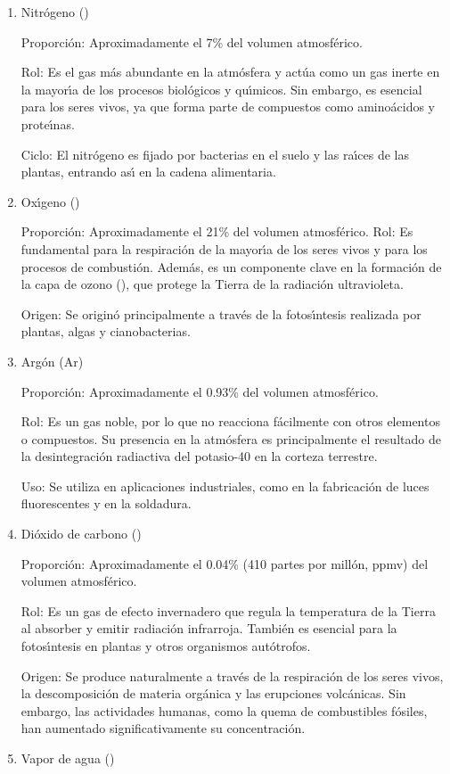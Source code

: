 \begin{enumerate}
\item  Nitr\'ogeno ()

Proporci\'on: Aproximadamente el 7\% del volumen atmosf\'erico.

Rol: Es el gas m\'as abundante en la atm\'osfera y act\'ua como un gas inerte en la mayor\'{\i}a de los procesos biol\'ogicos y qu\'{\i}micos. Sin embargo, es esencial para los seres vivos, ya que forma parte de compuestos como amino\'acidos y prote\'{\i}nas.

Ciclo: El nitr\'ogeno es fijado por bacterias en el suelo y las ra\'{\i}ces de las plantas, entrando as\'{\i} en la cadena alimentaria.
\item Ox\'{\i}geno ()

Proporci\'on: Aproximadamente el 21\% del volumen atmosf\'erico.
Rol: Es fundamental para la respiraci\'on de la mayor\'{\i}a de los seres vivos y para los procesos de combusti\'on. Adem\'as, es un componente clave en la formaci\'on de la capa de ozono (), que protege la Tierra de la radiaci\'on ultravioleta.

Origen: Se origin\'o principalmente a trav\'es de la fotos\'{\i}ntesis realizada por plantas, algas y cianobacterias.
\item Arg\'on (Ar)

Proporci\'on: Aproximadamente el 0.93\% del volumen atmosf\'erico.

Rol: Es un gas noble, por lo que no reacciona f\'acilmente con otros elementos o compuestos. Su presencia en la atm\'osfera es principalmente el resultado de la desintegraci\'on radiactiva del potasio-40 en la corteza terrestre.

Uso: Se utiliza en aplicaciones industriales, como en la fabricaci\'on de luces fluorescentes y en la soldadura.
\item Di\'oxido de carbono ()

Proporci\'on: Aproximadamente el 0.04\% (410 partes por mill\'on, ppmv) del volumen atmosf\'erico.

Rol: Es un gas de efecto invernadero que regula la temperatura de la Tierra al absorber y emitir radiaci\'on infrarroja. Tambi\'en es esencial para la fotos\'{\i}ntesis en plantas y otros organismos aut\'otrofos.

Origen: Se produce naturalmente a trav\'es de la respiraci\'on de los seres vivos, la descomposici\'on de materia org\'anica y las erupciones volc\'anicas. Sin embargo, las actividades humanas, como la quema de combustibles f\'osiles, han aumentado significativamente su concentraci\'on.
\item Vapor de agua ()


\end{enumerate}
